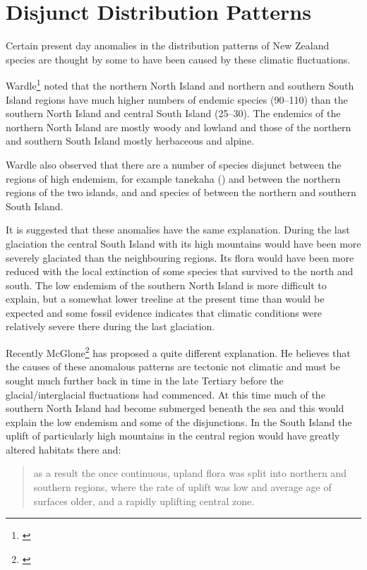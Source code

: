 \section{Disjunct Distribution Patterns}

Certain present day anomalies in the distribution patterns of New Zealand species are thought by some to have been caused by these climatic fluctuations.

Wardle\footnote{\cite{wardle1963evolution}} noted that the northern North Island and northern and southern South Island regions have much higher numbers of endemic species (90--110) than the southern North Island and central South Island (25--30).
The endemics of the northern North Island are mostly woody and lowland and those of the northern and southern South Island mostly herbaceous and alpine.

Wardle also observed that there are a number of species disjunct between the regions of high endemism, for example tanekaha () and  between the northern regions of the two islands, and  and species of  between the northern and southern South Island.

It is suggested that these anomalies have the same explanation.
During the last glaciation the central South Island with its high mountains would have been more severely glaciated than the neighbouring regions.
Its flora would have been more reduced with the local extinction of some species that survived to the north and south.
The low endemism of the southern North Island is more difficult to explain, but a somewhat lower treeline at the present time than would be expected and some fossil evidence indicates that climatic conditions were relatively severe there during the last glaciation.

Recently McGlone\footnote{\cite{mcglone1985plant}} has proposed a quite different explanation.
He believes that the causes of these anomalous patterns are tectonic not climatic and must be sought much further back in time in the late Tertiary before the glacial/interglacial fluctuations had commenced.
At this time much of the southern North Island had become submerged beneath the sea and this would explain the low endemism and some of the disjunctions.
In the South Island the uplift of particularly high mountains in the central region would have greatly altered habitats there and:

\begin{quote}
	as a result the once continuous, upland flora was split into northern and southern regions, where the rate of uplift was low and average age of surfaces older, and a rapidly uplifting central zone.
\end{quote}

